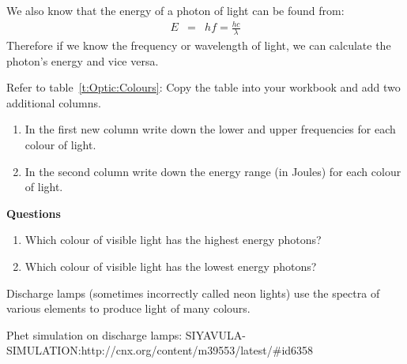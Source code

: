We also know that the energy of a photon of light can be found from:
\begin{eqnarray*}
E & = &hf = \frac{hc}{\lambda} 
\end{eqnarray*}
Therefore if we know the frequency or wavelength of light, we can calculate the photon's energy and vice versa. 

{
\noindent Refer to table~\ref{t:Optic:Colours}: Copy the table into your workbook and add two additional columns.
\begin{enumerate}
\item In the first new column write down the lower and upper frequencies for each colour of light. 
\item In the second column write down the energy range (in Joules) for each colour of light.
\end{enumerate}
\textbf{Questions}\\
\begin{enumerate}
\item Which colour of visible light has the highest energy photons?
\item Which colour of visible light has the lowest energy photons?
\end{enumerate} 
}
Discharge lamps (sometimes incorrectly called neon lights) use the spectra of various elements to produce light of many colours.

Phet simulation on discharge lamps: SIYAVULA-SIMULATION:http://cnx.org/content/m39553/latest/#id6358



